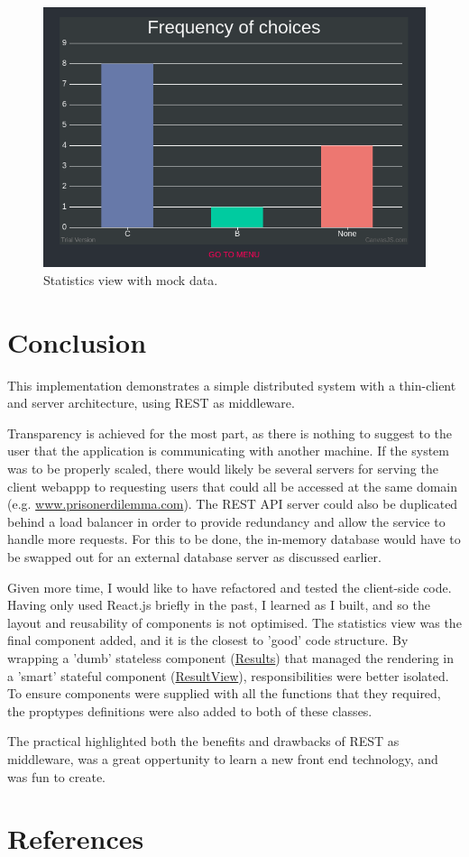 \documentclass[12pt]{article}
\begin{document}
\begin{figure}[!ht]
        \centering
        \includegraphics[width=\textwidth]{images/stats} %
        \caption{Statistics view with mock data.}
        \label{fig:stats}
\end{figure}

\part*{Conclusion}

This implementation demonstrates a simple distributed system with a thin-client and server architecture, using REST as middleware. 

Transparency is achieved for the most part, as there is nothing to suggest to the user that the application is communicating with another machine. If the system was to be properly scaled, there would likely be several servers for serving the client webappp to requesting users that could all be accessed at the same domain (e.g. \url{www.prisonerdilemma.com}). The REST API server could also be duplicated behind a load balancer in order to provide redundancy and allow the service to handle more requests. For this to be done, the in-memory database would have to be swapped out for an external database server as discussed earlier. 

Given more time, I would like to have refactored and tested the client-side code. Having only used React.js briefly in the past, I learned as I built, and so the layout and reusability of components is not optimised. The statistics view was the final component added, and it is the closest to 'good' code structure. By wrapping a 'dumb' stateless component (\url{Results}) that managed the rendering in a 'smart' stateful component (\url{ResultView}), responsibilities were better isolated. To ensure components were supplied with all the functions that they required, the proptypes definitions were also added to both of these classes.

The practical highlighted both the benefits and drawbacks of REST as middleware, was a great oppertunity to learn a new front end technology, and was fun to create.

\pagebreak

\part*{References}


\end{document}
